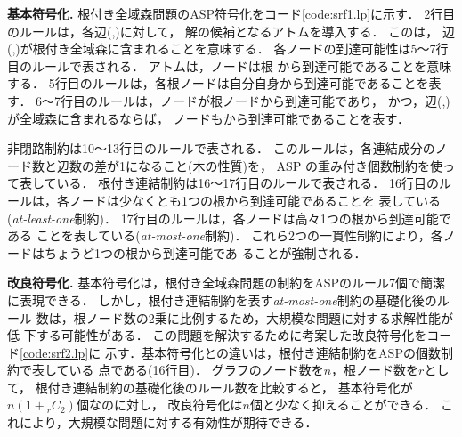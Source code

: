 \textbf{基本符号化.}
根付き全域森問題のASP符号化をコード\ref{code:srf1.lp}に示す．
2行目のルールは，各辺(,)に対して，
解の候補となるアトムを導入する．
このは，
辺(,)が根付き全域森に含まれることを意味する．
%
各ノードの到達可能性は5～7行目のルールで表される．
アトムは，ノードは根
から到達可能であることを意味する．
5行目のルールは，各根ノードは自分自身から到達可能であることを表す．
6～7行目のルールは，ノードが根ノードから到達可能であり，
かつ，辺(,)が全域森に含まれるならば，
ノードもから到達可能であることを表す．

非閉路制約は10～13行目のルールで表される．
このルールは，各連結成分のノード数と辺数の差が1になること(木の性質)を，
ASP の重み付き個数制約を使って表している．
%
根付き連結制約は16～17行目のルールで表される．
16行目のルールは，各ノードは少なくとも1つの根から到達可能であることを
表している(\textit{at-least-one}制約)．
17行目のルールは，各ノードは高々1つの根から到達可能である
ことを表している(\textit{at-most-one}制約)．
これら2つの一貫性制約により，各ノードはちょうど1つの根から到達可能であ
ることが強制される．

\textbf{改良符号化.}
基本符号化は，根付き全域森問題の制約をASPのルール7個で簡潔に表現できる．
しかし，根付き連結制約を表す\textit{at-most-one}制約の基礎化後のルール
数は，根ノード数の2乗に比例するため，大規模な問題に対する求解性能が低
下する可能性がある．
%
この問題を解決するために考案した改良符号化をコード\ref{code:srf2.lp}に
示す．基本符号化との違いは，根付き連結制約をASPの個数制約で表している
点である(16行目)．
グラフのノード数を$n$，根ノード数を$r$として，
根付き連結制約の基礎化後のルール数を比較すると，
基本符号化が$n(1+{}_{r}C_{2})$個なのに対し，
改良符号化は$n$個と少なく抑えることができる．
これにより，大規模な問題に対する有効性が期待できる．


